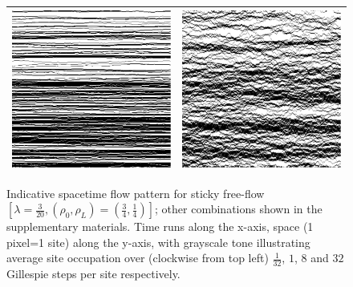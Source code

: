 \begin{figure}[h!]
\caption{\label{fig:flowPatterns} Indicative spacetime flow pattern for sticky free-flow $\left[\lambda = \frac{3}{20}, (\rho_0, \rho_L) = (\frac{3}{4}, \frac{1}{4})\right]$; other combinations shown in the supplementary materials.
Time runs along the x-axis, space (1 pixel=1 site) along the y-axis, with grayscale tone illustrating average site occupation over (clockwise from top left) $\frac{1}{32}$, $1$, $8$ and $32$ Gillespie steps per site respectively.}
\begin{center}
 \begin{tabular}{c | c}
    \includegraphics[width=0.49\linewidth]{../tex-src/images/newFlowImps/shortTime}  &\includegraphics[width=0.49\linewidth]{../tex-src/images/newFlowImps/midShortTime} \\
    \hline

\end{tabular}
\end{center}
\end{figure}
